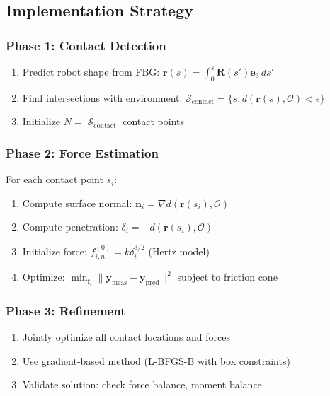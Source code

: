 \documentclass[11pt]{article}
\begin{document}
\subsection{Implementation Strategy}

\subsubsection{Phase 1: Contact Detection}

\begin{enumerate}
    \item Predict robot shape from FBG: $\mathbf{r}(s) = \int_0^s \mathbf{R}(s') \mathbf{e}_3 \, ds'$
    \item Find intersections with environment: $\mathcal{S}_{\text{contact}} = \{s : d(\mathbf{r}(s), \mathcal{O}) < \epsilon\}$
    \item Initialize $N = |\mathcal{S}_{\text{contact}}|$ contact points
\end{enumerate}

\subsubsection{Phase 2: Force Estimation}

For each contact point $s_i$:
\begin{enumerate}
    \item Compute surface normal: $\mathbf{n}_i = \nabla d(\mathbf{r}(s_i), \mathcal{O})$
    \item Compute penetration: $\delta_i = -d(\mathbf{r}(s_i), \mathcal{O})$
    \item Initialize force: $f_{i,n}^{(0)} = k \delta_i^{3/2}$ (Hertz model)
    \item Optimize: $\min_{\mathbf{f}_i} \|\mathbf{y}_{\text{meas}} - \mathbf{y}_{\text{pred}}\|^2$ subject to friction cone
\end{enumerate}

\subsubsection{Phase 3: Refinement}

\begin{enumerate}
    \item Jointly optimize all contact locations and forces
    \item Use gradient-based method (L-BFGS-B with box constraints)
    \item Validate solution: check force balance, moment balance
\end{enumerate}
\end{document}
